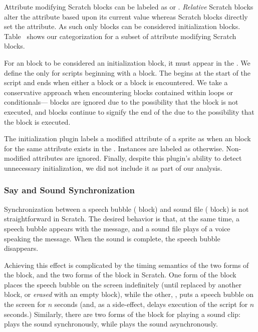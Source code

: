 Attribute modifying Scratch blocks can be labeled as \rel{} or
\abs{}. \emph{Relative} Scratch blocks alter the attribute based upon its
current value whereas \abs{} Scratch blocks directly set the attribute. As such
only \abs{} blocks can be considered initialization
blocks. Table~ shows our categorization for a
subset of attribute modifying Scratch blocks.

For an \abs{} block to be considered an initialization block, it must appear in
the \initzone{}. We define the \initzone{} only for scripts beginning with a
\greenflag{} block. The \initzone{} begins at the start of the script and ends
when either a \rel{} block or a \broadcast{} block is encountered. We take a
conservative approach when encountering blocks contained within loops or
conditionals---\abs{} blocks are ignored due to the possibility that the block
is not executed, and \rel{} blocks continue to signify the end of the
\initzone{} due to the possibility that the block is executed.

The initialization plugin labels a modified attribute of a sprite as \correct{}
when an \abs{} block for the same attribute exists in the
\initzone{}. Instances are labeled as \incor{} otherwise. Non-modified
attributes are ignored. Finally, despite this plugin's ability to detect
unnecessary initialization, we did not include it as part of our analysis.


\subsubsection{Say and Sound Synchronization}
Synchronization between a speech bubble (\say{} block) and sound file
(\playsound{} block) is not straightforward in Scratch.  The desired behavior
is that, at the same time, a speech bubble appears with the message, and a
sound file plays of a voice speaking the message.  When the sound is complete,
the speech bubble disappears.

Achieving this effect is complicated by the timing semantics of the two forms
of the \say{} block, and the two forms of the \playsound{} block in Scratch.
One form of the \say{} block places the speech bubble on the screen
indefinitely (until replaced by another \say{} block, or \emph{erased} with an
empty \say{} block), while the other, \sayfor{}, puts a speech bubble on the
screen for $n$ seconds (and, as a side-effect, delays execution of the script
for $n$ seconds.)  Similarly, there are two forms of the block for playing a
sound clip: \playsounddone{} plays the sound synchronously, while \playsound{}
plays the sound asynchronously.

